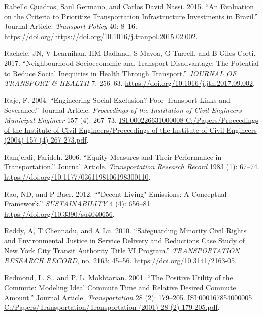 \documentclass[12pt, oneside]{report}
\newlength{\cslhangindent}
\newlength{\cslentryspacingunit} %
\newenvironment{CSLReferences}[2] %
 {%
  \setlength{\parindent}{0pt}
  \ifodd #1
  \let\oldpar\par
  \def\par{\hangindent=\cslhangindent\oldpar}
  \fi
  \setlength{\parskip}{#2\cslentryspacingunit}
 }%
 {}
\begin{document}
\begin{CSLReferences}{1}{0}
\leavevmode{}%
Rabello Quadros, Saul Germano, and Carlos David Nassi. 2015. {``An
Evaluation on the Criteria to Prioritize Transportation Infrastructure
Investments in Brazil.''} Journal Article. \emph{Transport Policy} 40:
8--16.
https://doi.org/\url{https://doi.org/10.1016/j.tranpol.2015.02.002}.

\leavevmode{}%
Rachele, JN, V Learnihan, HM Badland, S Mavoa, G Turrell, and B
Giles-Corti. 2017. {``Neighbourhood Socioeconomic and Transport
Disadvantage: {The} Potential to Reduce Social Inequities in Health
Through Transport.''} \emph{JOURNAL OF TRANSPORT \& HEALTH} 7: 256--63.
\url{https://doi.org/10.1016/j.jth.2017.09.002}.

\leavevmode{}%
Raje, F. 2004. {``Engineering Social Exclusion? Poor Transport Links and
Severance.''} Journal Article. \emph{Proceedings of the Institution of
Civil Engineers-Municipal Engineer} 157 (4): 267--73.
\href{https://ISI:000226631000008\%0AC:/Papers/Proceedings\%20of\%20the\%20Institute\%20of\%20Civil\%20Engineers/Proceedings\%20of\%20the\%20Institute\%20of\%20Civil\%20Engineers\%20(2004)\%20157\%20(4)\%20267-273.pdf}{ISI:000226631000008
C:/Papers/Proceedings of the Institute of Civil Engineers/Proceedings of
the Institute of Civil Engineers (2004) 157 (4) 267-273.pdf}.

\leavevmode{}%
Ramjerdi, Farideh. 2006. {``Equity Measures and Their Performance in
Transportation.''} Journal Article. \emph{Transportation Research
Record} 1983 (1): 67--74.
\url{https://doi.org/10.1177/0361198106198300110}.

\leavevmode{}%
Rao, ND, and P Baer. 2012. {``"{Decent Living}" {Emissions}: {A
Conceptual Framework}.''} \emph{SUSTAINABILITY} 4 (4): 656--81.
\url{https://doi.org/10.3390/su4040656}.

\leavevmode{}%
Reddy, A, T Chennadu, and A Lu. 2010. {``Safeguarding {Minority Civil
Rights} and {Environmental Justice} in {Service Delivery} and
{Reductions Case Study} of {New York City Transit Authority Title VI
Program}.''} \emph{TRANSPORTATION RESEARCH RECORD}, no. 2163: 45--56.
\url{https://doi.org/10.3141/2163-05}.

\leavevmode{}%
Redmond, L. S., and P. L. Mokhtarian. 2001. {``The Positive Utility of
the Commute: Modeling Ideal Commute Time and Relative Desired Commute
Amount.''} Journal Article. \emph{Transportation} 28 (2): 179--205.
\href{https://ISI:000167854000005\%0AC:/Papers/Transportation/Transportation\%20(2001)\%2028\%20(2)\%20179-205.pdf}{ISI:000167854000005
C:/Papers/Transportation/Transportation (2001) 28 (2) 179-205.pdf}.


\end{CSLReferences}
\end{document}
